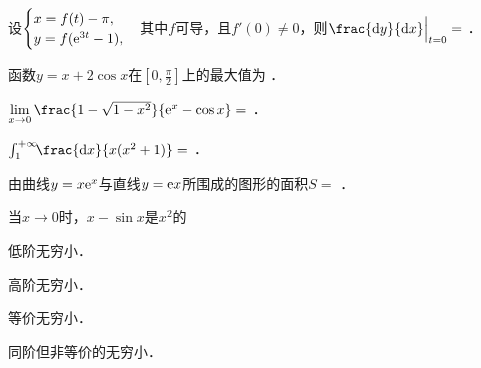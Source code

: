 \documentclass[plain,noanswer,medmath]{../../template/jnuexam}
\begin{document}






\begin{problem}
设$\begin{cases}
 x = f(t) - \pi , \\
 y = f(\mathrm{e}^{3t} - 1),
\end{cases}$其中$f$可导，且$f'(0) \ne 0$，则$\frac{\dy}{\dx}\Big|_{t=0}=$ \fillin{}．
\end{problem}


\begin{problem}
函数$y = x + 2\cos x$在$\left[0,\frac{\pi}{2} \right]$上的最大值为 \fillin{}．
\end{problem}


\begin{problem}
$\lim_{x \to 0} \frac{1 - \sqrt{1 - x^2}}{\e^x - \cos x} =$ \fillin{}．
\end{problem}


\begin{problem}
$\int_1^{+\infty}\!\!\frac{\dx}{x(x^2 + 1)} =$ \fillin{}．
\end{problem}


\begin{problem}
由曲线$y = x\mathrm{e}^x$与直线$y = \mathrm{e} x$所围成的图形的面积$S=$ \fillin{}．
\end{problem}




\begin{problem}
当$x \to 0$时，$x - \sin x$是$x^2$的\pickout{}
\begin{abcd}
\item 低阶无穷小．				
\item 高阶无穷小．
\item 等价无穷小．				
\item 同阶但非等价的无穷小．
\end{abcd}
\end{problem}
\end{document}
